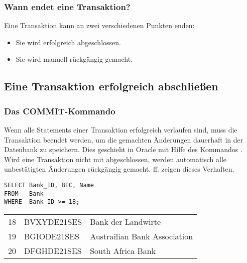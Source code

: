         \subsubsection{Wann endet eine Transaktion?}
          Eine Transaktion kann an zwei verschiedenen Punkten enden:
          \begin{itemize}
            \item Sie wird erfolgreich abgeschlossen.
            \item Sie wird manuell r\"uckg\"angig gemacht.
          \end{itemize}
      \subsection{Eine Transaktion erfolgreich abschlie\ss en}
        \subsubsection{Das COMMIT-Kommando}
          Wenn alle Statements einer Transaktion erfolgreich verlaufen sind, muss
          die Transaktion beendet werden, um die gemachten \"Anderungen dauerhaft
          in der Datenbank zu speichern. Dies geschieht in Oracle mit Hilfe des
          Kommandos \COMMIT. Wird eine Transaktion nicht mit \COMMIT{} abgeschlossen, werden
          automatisch alle unbestätigten \"Anderungen r\"uckg\"angig gemacht.
           ff. zeigen dieses Verhalten.
          \begin{lstlisting}[language=oracle_sql,caption={Eine Transaktion wird abgebrochen},label=sql07_23]
SELECT Bank_ID, BIC, Name
FROM   Bank
WHERE  Bank_ID >= 18;
          \end{lstlisting}
          \begin{center}
            \begin{small}
              \tablehead{}
              \begin{msoraclesql}
                \begin{supertabular}{rll}
                  18 & BVXYDE21SES & Bank der Landwirte \\
                  19 & BGIODE21SES & Austrailian Bank Association \\
                  20 & DFGHDE21SES & South Africa Bank \\
                \end{supertabular}
              \end{msoraclesql}
            \end{small}
          \end{center}
